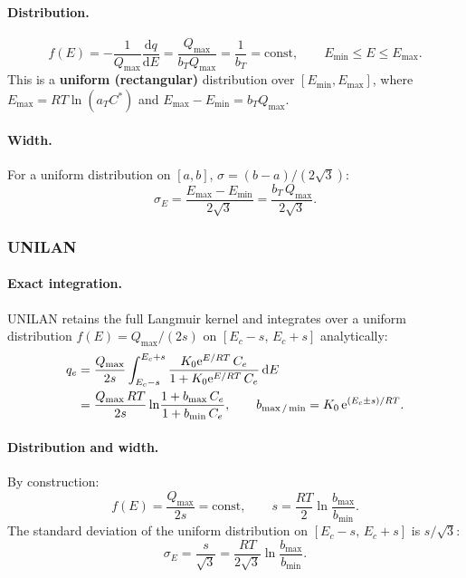 \documentclass[journal=jacsat,manuscript=article]{achemso}
\begin{document}
\paragraph{Distribution.}
\begin{equation}
	f(E) = -\frac{1}{Q_{\max}}\frac{\mathrm{d}q}{\mathrm{d}E}
	= \frac{Q_{\max}}{b_T Q_{\max}} = \frac{1}{b_T} = \text{const},
	\qquad E_{\min} \leq E \leq E_{\max}.
	\label{eq:si_fE_temkin}
\end{equation}
This is a \textbf{uniform (rectangular)} distribution over $[E_{\min}, E_{\max}]$,
where $E_{\max} = RT\ln(a_T C^{\ast})$ and $E_{\max} - E_{\min} = b_T Q_{\max}$.

\paragraph{Width.}
For a uniform distribution on $[a,b]$, $\sigma = (b-a)/(2\sqrt{3})$:
\begin{equation}
	\sigma_E = \frac{E_{\max}-E_{\min}}{2\sqrt{3}}
	= \frac{b_T\,Q_{\max}}{2\sqrt{3}}.
	\label{eq:si_sigmaE_temkin}
\end{equation}

\subsubsection{UNILAN}

\paragraph{Exact integration.}
UNILAN retains the full Langmuir kernel and integrates over a uniform distribution
$f(E) = Q_{\max}/(2s)$ on $[E_c-s,\,E_c+s]$ analytically:
\begin{align}
	q_e &= \frac{Q_{\max}}{2s}\int_{E_c-s}^{E_c+s}
	\frac{K_0\mathrm{e}^{E/RT}\,C_e}{1+K_0\mathrm{e}^{E/RT}\,C_e}\,\mathrm{d}E
	\notag \\
	&= \frac{Q_{\max}\,RT}{2s}
	\ln\!\frac{1+b_{\max}\,C_e}{1+b_{\min}\,C_e},
	\qquad b_{\max/\min} = K_0\,\mathrm{e}^{(E_c\pm s)/RT}.
\end{align}

\paragraph{Distribution and width.}
By construction:
\begin{equation}
	f(E) = \frac{Q_{\max}}{2s} = \text{const},
	\qquad s = \frac{RT}{2}\ln\!\frac{b_{\max}}{b_{\min}}.
	\label{eq:si_fE_unilan}
\end{equation}
The standard deviation of the uniform distribution on $[E_c-s,\,E_c+s]$ is $s/\sqrt{3}$:
\begin{equation}
	\sigma_E = \frac{s}{\sqrt{3}}
	= \frac{RT}{2\sqrt{3}}\ln\!\frac{b_{\max}}{b_{\min}}.
	\label{eq:si_sigmaE_unilan}
\end{equation}
\end{document}
